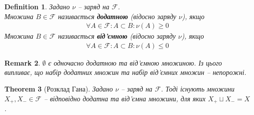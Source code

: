 \documentclass[a4paper, 10pt]{article}
\theoremstyle{theoremdd}
\newtheorem{theorem}{Theorem}[subsection]
\newtheorem{definition}[theorem]{Definition}
\newtheorem{remark}[theorem]{Remark}
\begin{document}
\begin{definition}
Задано $\nu$ -- заряд на $\mathcal{F}$.\\
Множина $B \in \mathcal{F}$ називається \textbf{додатною} (відосно заряду $\nu$), якщо
\begin{align*}
\forall A \in \mathcal{F}: A \subset B: \nu(A) \geq 0
\end{align*}
Множина $B \in \mathcal{F}$ називається \textbf{від'ємною} (відосно заряду $\nu$), якщо
\begin{align*}
\forall A \in \mathcal{F}: A \subset B: \nu(A) \leq 0
\end{align*}
\end{definition}

\begin{remark}
$\emptyset$ є одночасно додатною та від'ємною множиною. Із цього випливає, що набір додатних множин та набір від'ємних множин -- непорожні.
\end{remark}

\begin{theorem}[Розклад Гана]
Задано $\nu$ -- заряд на $\mathcal{F}$. Тоді існують множини $X_+, X_- \in \mathcal{F}$ -- відповідно додатна та від'ємна множини, для яких $X_+ \sqcup X_- = X$.
\end{theorem}
\end{document}
